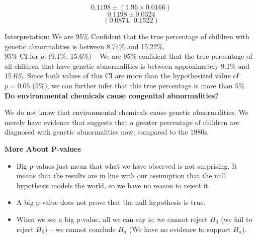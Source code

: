 \[
0.1198 \pm (1.96 \times 0.0166)
\]
\[
0.1198 \pm 0.0324
\]
\[
(0.0874,\ 0.1522)
\]

Interpretation: We are 95\% Confident that the true percentage of children with genetic abnormalities is between 8.74\% and 15.22\%. \\
95\% CI for $p$: (9.1\%, 15.6\%) – We are 95\% confident that the true percentage of all children that have genetic abnormalities is between approximately 9.1\% and 15.6\%. Since both values of this CI are more than the hypothesized value of $p = 0.05$ (5\%), we can further infer that this true percentage is more than 5\%. \\
\textbf{Do environmental chemicals cause congenital abnormalities?}

We do not know that environmental chemicals cause genetic abnormalities. We merely have evidence that suggests that a greater percentage of children are diagnosed with genetic abnormalities now, compared to the 1980s.
\begin{nt}
\textbf{More About P-values}

\begin{itemize}
  \item Big p-values just mean that what we have observed is not surprising. It means that the results are in line with our assumption that the null hypothesis models the world, so we have no reason to reject it.
  \item A big p-value does not prove that the null hypothesis is true.
  \item When we see a big p-value, all we can say is: we cannot reject $H_0$ (we fail to reject $H_0$) – we cannot conclude $H_a$ (We have no evidence to support $H_a$).
\end{itemize}
\end{nt}
